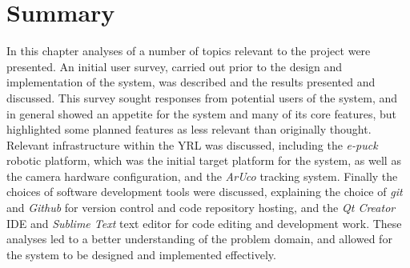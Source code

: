 
\section{Summary}
In this chapter analyses of a number of topics relevant to the project were presented. An initial user survey, carried out prior to the design and implementation of the system, was described and the results presented and discussed. This survey sought responses from potential users of the system, and in general showed an appetite for the system and many of its core features, but highlighted some planned features as less relevant than originally thought. Relevant infrastructure within the YRL was discussed, including the \textit{e-puck} robotic platform, which was the initial target platform for the system, as well as the camera hardware configuration, and the \textit{ArUco} tracking system. Finally the choices of software development tools were discussed, explaining the choice of \textit{git} and \textit{Github} for version control and code repository hosting, and the \textit{Qt Creator} IDE and \textit{Sublime Text} text editor for code editing and development work. These analyses led to a better understanding of the problem domain, and allowed for the system to be designed and implemented effectively.